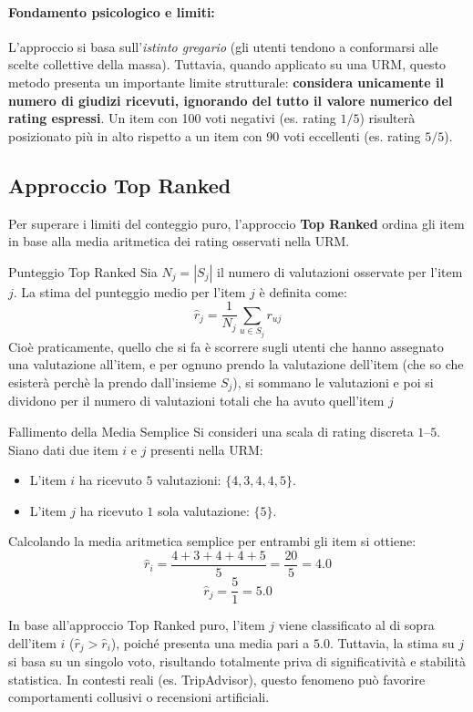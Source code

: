 \paragraph{Fondamento psicologico e limiti:}
L'approccio si basa sull'\textit{istinto gregario} (gli utenti tendono a conformarsi alle scelte collettive della massa). Tuttavia, quando applicato su una URM, questo metodo presenta un importante limite strutturale: \textbf{considera unicamente il numero di giudizi ricevuti, ignorando del tutto il valore numerico del rating espressi}. Un item con 100 voti negativi (es. rating $1/5$) risulterà posizionato più in alto rispetto a un item con 90 voti eccellenti (es. rating $5/5$).

\subsection{Approccio Top Ranked}
Per superare i limiti del conteggio puro, l'approccio \textbf{Top Ranked} ordina gli item in base alla media aritmetica dei rating osservati nella URM.

\begin{definition}{Punteggio Top Ranked}
Sia $N_j = |S_j|$ il numero di valutazioni osservate per l'item $j$. La stima del punteggio medio per l'item $j$ è definita come:
\[
\hat{r}_j = \frac{1}{N_j} \sum_{u \in S_j} r_{uj}
\]
Cioè praticamente, quello che si fa è scorrere sugli utenti che hanno assegnato una valutazione all'item, e per ognuno prendo la valutazione dell'item (che so che esisterà perchè la prendo dall'insieme $S_j$), si sommano le valutazioni e poi si dividono per il numero di valutazioni totali che ha avuto quell'item $j$
\end{definition}

\begin{example}{Fallimento della Media Semplice}
Si consideri una scala di rating discreta $1$--$5$. Siano dati due item $i$ e $j$ presenti nella URM:
\begin{itemize}
    \item L'item $i$ ha ricevuto $5$ valutazioni: $\{4, 3, 4, 4, 5\}$.
    \item L'item $j$ ha ricevuto $1$ sola valutazione: $\{5\}$.
\end{itemize}

Calcolando la media aritmetica semplice per entrambi gli item si ottiene:
\[
\hat{r}_i = \frac{4 + 3 + 4 + 4 + 5}{5} = \frac{20}{5} = 4.0
\]
\[
\hat{r}_j = \frac{5}{1} = 5.0
\]

In base all'approccio Top Ranked puro, l'item $j$ viene classificato al di sopra dell'item $i$ ($\hat{r}_j > \hat{r}_i$), poiché presenta una media pari a $5.0$. Tuttavia, la stima su $j$ si basa su un singolo voto, risultando totalmente priva di significatività e stabilità statistica. In contesti reali (es. TripAdvisor), questo fenomeno può favorire comportamenti collusivi o recensioni artificiali.
\end{example}

